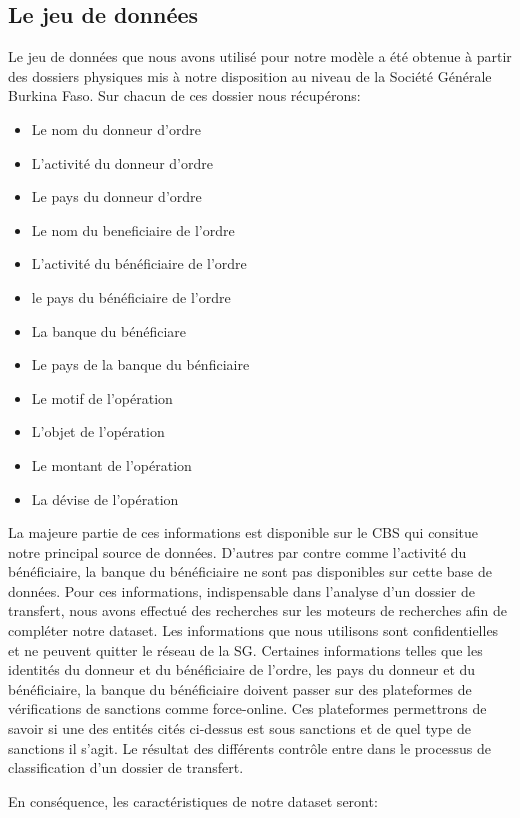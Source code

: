 \subsection{Le jeu de données}
Le jeu de données que nous avons utilisé pour notre modèle a été obtenue à
partir des dossiers physiques mis à notre disposition au niveau de la Société
Générale Burkina Faso. Sur chacun de ces dossier nous récupérons:
\begin{itemize}
  \item Le nom du donneur d'ordre
  \item L'activité du donneur d'ordre
  \item Le pays du donneur d'ordre
  \item Le nom du beneficiaire de l'ordre
  \item L'activité du bénéficiaire de l'ordre
  \item le pays du bénéficiaire de l'ordre
  \item La banque du bénéficiare
  \item Le pays de la banque du bénficiaire
  \item Le motif de l'opération
  \item L'objet de l'opération
  \item Le montant de l'opération
  \item La dévise de l'opération
\end{itemize}
La majeure partie de ces informations est disponible sur le CBS qui consitue
notre principal source de données. D'autres par contre comme l'activité du
bénéficiaire, la banque du bénéficiaire ne sont pas disponibles sur cette base
de données. Pour ces informations, indispensable dans l'analyse d'un dossier de
transfert, nous avons effectué des recherches sur les moteurs de recherches afin
de compléter notre dataset.
Les informations que nous utilisons sont confidentielles et ne peuvent quitter 
le réseau de la SG.
Certaines informations telles que les identités du donneur et du 
bénéficiaire de l'ordre, les pays du donneur et du bénéficiaire, la 
banque du bénéficiaire doivent passer sur des plateformes de vérifications
de sanctions comme force-online. Ces plateformes permettrons de savoir si une
des entités cités ci-dessus est sous sanctions et de quel type de sanctions il
s'agit. Le résultat des différents contrôle entre dans le processus de 
classification d'un dossier de transfert.

En conséquence, les caractéristiques de notre dataset seront:

